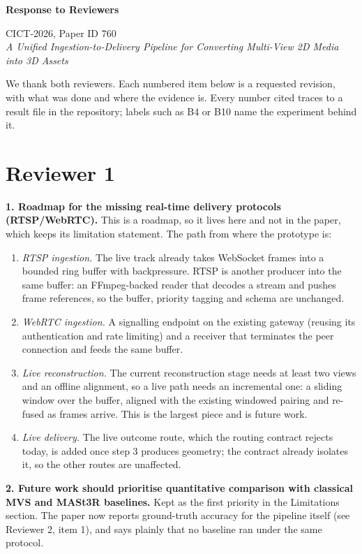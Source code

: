 \documentclass[11pt,a4paper]{article}
\newcommand{\request}[1]{\par\medskip\noindent\textbf{#1}}
\begin{document}
{\Large\bfseries Response to Reviewers\par}
\smallskip
CICT-2026, Paper ID 760\\
\textit{A Unified Ingestion-to-Delivery Pipeline for Converting Multi-View 2D Media into 3D Assets}

\medskip
We thank both reviewers. Each numbered item below is a requested revision, with
what was done and where the evidence is. Every number cited traces to a result
file in the repository; labels such as B4 or B10 name the experiment behind it.

\section{Reviewer 1}

\request{1. Roadmap for the missing real-time delivery protocols (RTSP/WebRTC).}
This is a roadmap, so it lives here and not in the paper, which keeps its
limitation statement. The path from where the prototype is:

\begin{enumerate}
\item \textit{RTSP ingestion.} The live track already takes WebSocket frames into a
  bounded ring buffer with backpressure. RTSP is another producer into the same
  buffer: an FFmpeg-backed reader that decodes a stream and pushes
  frame references, so the buffer, priority tagging and schema are unchanged.
\item \textit{WebRTC ingestion.} A signalling endpoint on the existing gateway (reusing
  its authentication and rate limiting) and a receiver that terminates the
  peer connection and feeds the same buffer.
\item \textit{Live reconstruction.} The current reconstruction stage needs at least two
  views and an offline alignment, so a live path needs an incremental one: a
  sliding window over the buffer, aligned with the existing windowed pairing
  and re-fused as frames arrive. This is the largest piece and is future work.
\item \textit{Live delivery.} The live outcome route, which the routing contract rejects
  today, is added once step 3 produces geometry; the contract already
  isolates it, so the other routes are unaffected.
\end{enumerate}

\request{2. Future work should prioritise quantitative comparison with classical MVS
and MASt3R baselines.}
Kept as the first priority in the Limitations section.
The paper now reports ground-truth accuracy for the pipeline itself (see
Reviewer 2, item 1), and says plainly that no baseline ran under the same
protocol.
\end{document}
